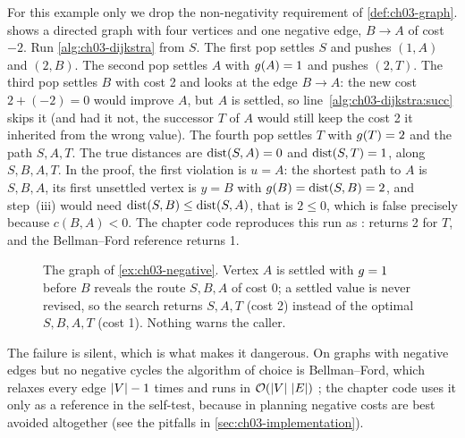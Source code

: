 \begin{example}
\label{ex:ch03-negative}
%
For this example only we drop the non-negativity requirement of \cref{def:ch03-graph}.
 shows a directed graph with four vertices and one negative edge,
$B\to A$ of cost $-2$. Run \cref{alg:ch03-dijkstra} from $S$. The first pop settles $S$ and
pushes $(1,A)$ and $(2,B)$. The second pop settles $A$ with $g(A)=1$ and pushes $(2,T)$. The
third pop settles $B$ with cost 2 and looks at the edge $B\to A$: the new cost $2+(-2)=0$ would
improve $A$, but $A$ is settled, so line~\ref{alg:ch03-dijkstra:succ} skips it (and had it not,
the successor $T$ of $A$ would still keep the cost 2 it inherited from the wrong value). The
fourth pop settles $T$ with $g(T)=2$ and the path $S,A,T$. The true distances are
$\operatorname{dist}(S,A)=0$ and $\operatorname{dist}(S,T)=1$, along $S,B,A,T$. In the proof, the first violation is
$u=A$: the shortest path to $A$ is $S,B,A$, its first unsettled vertex is $y=B$ with
$g(B)=\operatorname{dist}(S,B)=2$, and step~(iii) would need $\operatorname{dist}(S,B)\le\operatorname{dist}(S,A)$, that is
$2\le0$, which is false precisely because $c(B,A)<0$. The chapter code reproduces this run as
:  returns 2 for $T$, and the Bellman--Ford reference
returns 1.
\end{example}

\begin{figure}[tb]
  \centering
  \caption{The graph of \cref{ex:ch03-negative}. Vertex $A$ is settled with $g=1$ before
$B$ reveals the route $S,B,A$ of cost 0; a settled value is never revised, so the search
returns $S,A,T$ (cost 2) instead of the optimal $S,B,A,T$ (cost 1). Nothing warns the caller.}
  \label{fig:ch03-negative-edge}
\end{figure}

The failure is silent, which is what makes it dangerous. On graphs with negative edges but no
negative cycles the algorithm of choice is Bellman--Ford,
which relaxes every edge $\left\lvert V \right\rvert-1$ times and runs in $\mathcal{O}\!\left(\left\lvert V \right\rvert\,\left\lvert E \right\rvert\right)$
\cite{cormen2009clrs}; the chapter code uses it only as a reference in the self-test, because
in planning negative costs are best avoided altogether (see the pitfalls in
\cref{sec:ch03-implementation}).

